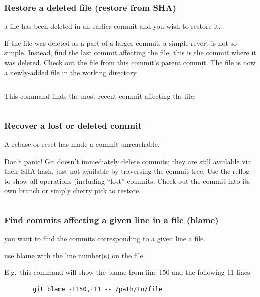 \documentclass{git_course}
\begin{document}
\begin{frame}[fragile]
    \frametitle{Restore a deleted file (restore from SHA)}
     a file has been deleted in an earlier commit and you wish
    to restore it.

     If the file was deleted as a part of a larger commit, a
    simple revert is not so simple.  Instead, find the last commit affecting
    the file; this is the commit where it was deleted.  Check out the file
    from this commit's parent commit.  The file is now a newly-added file in
    the working directory.

    \inputminted{bash}{restore-deleted-file-from-sha.txt}

This command finds the most recent commit affecting the file:
    \inputminted{bash}{most-recent-commit-affecting-file.txt}

\end{frame}

\begin{frame}[fragile]
    \frametitle{Recover a lost or deleted commit}
     A rebase or reset has made a commit unreachable.

     Don't panic! Git doesn't immediately delete commits;
    they are still available via their SHA hash, just not available by
    traversing the commit tree.  Use the reflog to show all operations
    (including ``lost'' commits.  Check out the commit into its own branch
    or simply cherry pick to restore.

    \inputminted{bash}{recover-lost-or-deleted-commit.txt}

\end{frame}

\begin{frame}[fragile]
    \frametitle{Find commits affecting a given line in a file (blame)}

     you want to find the commits corresponding to a given
    line a file.

     use blame with the line number(s) on the file.

E.g.\ this command will show the blame from line 150 and the following 11 lines.
    \begin{verbatim}
        git blame -L150,+11 -- /path/to/file
    \end{verbatim}

\end{frame}
\end{document}
